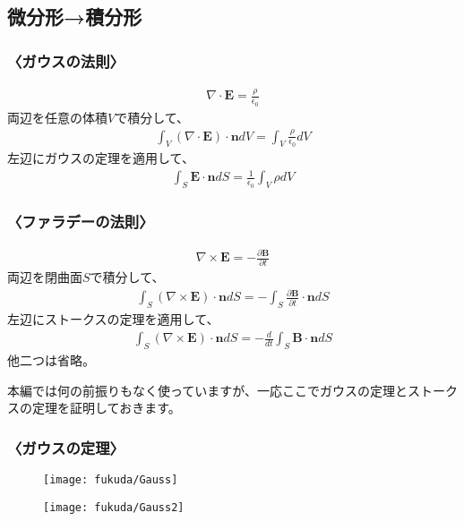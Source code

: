 \documentclass[10pt,b5paper,papersize,dvipdfmx]{jsbook}
\begin{document}
\subsection{微分形→積分形}
\subsubsection{〈ガウスの法則〉}
\begin{align}
\nabla\cdot\mathbf{E} = \frac{\rho}{\epsilon_0}
\end{align}
両辺を任意の体積$V$で積分して、
\begin{align}
\int_V (\nabla\cdot\mathbf{E})\cdot\mathbf{n}dV=\int_V \frac{\rho}{\epsilon_0}dV
\end{align}
左辺にガウスの定理を適用して、
\begin{align}
\int_S \mathbf{E}\cdot \mathbf{n} dS = \frac{1}{\epsilon_0} \int_V \rho dV
\end{align}

\subsubsection{〈ファラデーの法則〉}
\begin{align}
\nabla\times\mathbf{E} = -\frac{\partial\mathbf{B}}{\partial t}
\end{align}
両辺を閉曲面$S$で積分して、
\begin{align}
\int_S (\nabla\times\mathbf{E})\cdot\mathbf{n}dS = -\int_S \frac{\partial\mathbf{B}}{\partial t}\cdot\mathbf{n}dS
\end{align}
左辺にストークスの定理を適用して、
\begin{align}
\int_S (\nabla\times\mathbf{E})\cdot\mathbf{n} dS = -\frac{d}{dt}\int_S \mathbf{B}\cdot \mathbf{n} dS
\end{align}
他二つは省略。
\par
\par
本編では何の前振りもなく使っていますが、一応ここでガウスの定理とストークスの定理を証明しておきます。
\subsubsection{〈ガウスの定理〉}
\begin{figure}[htbp]
  \begin{flushright}
  \texttt{[image: fukuda/Gauss]}
  \end{flushright}
\end{figure}

\begin{figure}[htbp]
  \begin{flushright}
  \texttt{[image: fukuda/Gauss2]}
  \end{flushright}
\end{figure}
\end{document}
